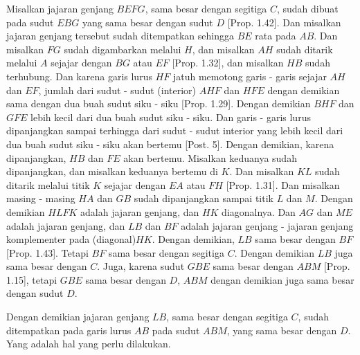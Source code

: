 \documentclass[a4paper]{book}
\begin{document}
Misalkan  jajaran genjang $BEFG$, sama besar dengan segitiga $C$, sudah 
dibuat pada sudut $EBG$ yang sama besar dengan sudut $D$ [Prop. 1.42]. Dan 
misalkan jajaran genjang tersebut sudah ditempatkan sehingga $BE$ rata pada
$AB$. Dan misalkan $FG$ sudah digambarkan melalui $H$, dan misalkan $AH$
sudah ditarik melalui $A$ sejajar dengan $BG$ atau $EF$ [Prop. 1.32], dan 
misalkan $HB$ sudah terhubung. Dan karena garis lurus $HF$ jatuh memotong
garis - garis sejajar $AH$ dan $EF$, jumlah dari sudut - sudut (interior)
$AHF$ dan $HFE$ dengan demikian sama dengan dua buah sudut siku - siku 
[Prop. 1.29].
Dengan demikian $BHF$ dan $GFE$ lebih kecil dari dua buah sudut siku - siku.
Dan garis - garis lurus dipanjangkan sampai terhingga dari sudut - sudut
interior yang lebih kecil dari dua buah sudut siku - siku akan bertemu 
[Post. 5]. Dengan demikian, karena dipanjangkan, $HB$ dan $FE$ akan bertemu.
Misalkan keduanya sudah dipanjangkan, dan misalkan keduanya bertemu di
$K$. Dan misalkan $KL$ sudah ditarik melalui titik $K$ sejajar dengan 
$EA$ atau $FH$ [Prop. 1.31]. Dan misalkan masing - masing $HA$ dan $GB$ 
sudah dipanjangkan sampai titik $L$ dan $M$. Dengan demikian
$HLFK$ adalah jajaran genjang, dan $HK$ diagonalnya. Dan $AG$ dan $ME$ 
adalah jajaran genjang, dan $LB$ dan $BF$ adalah jajaran genjang - jajaran
genjang komplementer pada (diagonal)$HK$. Dengan demikian, $LB$ sama besar 
dengan $BF$ 
[Prop. 1.43]. Tetapi $BF$ sama besar dengan segitiga $C$. Dengan demikian
$LB$ juga sama besar dengan $C$. Juga, karena sudut $GBE$ sama besar dengan
$ABM$ [Prop. 1.15], tetapi $GBE$ sama besar dengan $D$, $ABM$ dengan
demikian juga sama besar dengan sudut $D$.

Dengan demikian jajaran genjang $LB$, sama besar dengan segitiga $C$, sudah
ditempatkan pada garis lurus $AB$ pada sudut $ABM$, yang sama besar dengan 
$D$. Yang adalah hal yang perlu dilakukan.

\end{document}
